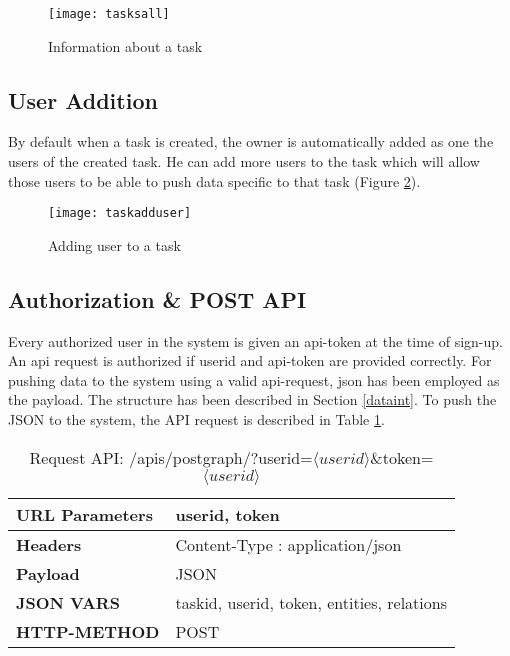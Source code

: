 \begin{figure}[H]
\begin{center}  
\texttt{[image: tasksall]} 
\caption{Information about a task}
\label{fig:tasksall}
\end{center}
\end{figure}


\subsection{User Addition}
By default when a task is created, the owner is automatically added as one the users of the created task.
He can add more users to the task which will allow those users to be able to push data specific to that task (Figure \ref{fig:taskadduser}).

\begin{figure}[H]
\begin{center}  
\texttt{[image: taskadduser]} 
\caption{Adding user to a task}
\label{fig:taskadduser}
\end{center}
\end{figure}


\subsection{Authorization \& POST API}
Every authorized user in the system is given an api-token at the time of sign-up. An api request is authorized if userid and api-token are provided correctly. For pushing data to the system using a valid api-request, json has been employed as the payload. The structure has been described in Section \ref{dataint}. To push the JSON to the system, the API request is described in Table \ref{tab:postjson}.

\begin{table}[H]
\centering
\caption{Request API: /apis/postgraph/?userid=$\langle userid \rangle$\&token=$\langle userid \rangle$}
\label{tab:postjson}
\begin{tabular}{ll}

\textbf{URL Parameters} & userid, token                              \\

\hline

\textbf{Headers}        & Content-Type : application/json            \\

\hline

\textbf{Payload}        & JSON                                       \\

\hline

\textbf{JSON VARS}      & taskid, userid, token, entities, relations \\
\hline

\textbf{HTTP-METHOD}    & POST      \\
\hline                                

\end{tabular}
\end{table}

